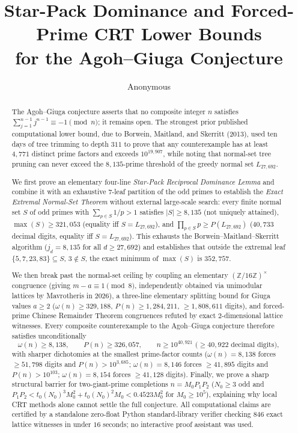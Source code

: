 \documentclass[11pt]{article}
\title{Star-Pack Dominance and Forced-Prime CRT Lower Bounds\\
for the Agoh--Giuga Conjecture}
\author{Anonymous}
\date{}
\theoremstyle{remark}
\begin{document}
\maketitle

\begin{abstract}
The Agoh--Giuga conjecture asserts that no composite integer $n$ satisfies
$\sum_{j=1}^{n-1} j^{n-1} \equiv -1 \pmod n$; it remains open. The strongest
prior published computational lower bound, due to Borwein, Maitland, and
Skerritt (2013), used ten days of tree trimming to depth $311$ to prove that any
counterexample has at least $4{,}771$ distinct prime factors and exceeds
$10^{19{,}907}$, while noting that normal-set tree pruning can never exceed the
$8{,}135$-prime threshold of the greedy normal set $L_{27,692}$.

We first prove an elementary four-line \emph{Star-Pack Reciprocal Dominance
Lemma} and combine it with an exhaustive $7$-leaf partition of the odd primes to
establish the \emph{Exact Extremal Normal-Set Theorem} without external
large-scale search: every finite normal set $S$ of odd primes with
$\sum_{p\in S} 1/p > 1$ satisfies $|S| \ge 8{,}135$ (not uniquely attained),
$\max(S) \ge 321{,}053$ (equality iff $S = L_{27,692}$), and
$\prod_{p\in S} p \ge P(L_{27,692})$ ($40{,}733$ decimal digits, equality iff
$S = L_{27,692}$). This exhausts the Borwein--Maitland--Skerritt algorithm
($j_d = 8{,}135$ for all $d \ge 27{,}692$) and establishes that outside the
extremal leaf $\{5,7,23,83\}\subseteq S$, $3\notin S$, the exact minimum of
$\max(S)$ is $352{,}757$.

We then break past the normal-set ceiling by coupling an elementary
$(\mathbb{Z}/16\mathbb{Z})^\times$ congruence (giving $m - a \equiv 1 \pmod 8$,
independently obtained via unimodular lattices by Mavrotheris in 2026), a
three-line elementary splitting bound for Giuga values $a \ge 2$
($\omega(n)\ge 329{,}188$, $P(n)\ge 1{,}284{,}211$, $\ge 1{,}808{,}611$ digits),
and forced-prime Chinese Remainder Theorem congruences refuted by exact
$2$-dimensional lattice witnesses. Every composite counterexample to the
Agoh--Giuga conjecture therefore satisfies unconditionally
\[
  \omega(n) \ge 8{,}138,
  \qquad
  P(n) \ge 326{,}057,
  \qquad
  n \ge 10^{40{,}921} \text{ ($\ge 40{,}922$ decimal digits)},
\]
with sharper dichotomies at the smallest prime-factor counts ($\omega(n)=8{,}138$
forces $\ge 51{,}798$ digits and $P(n) > 10^{3{,}685}$; $\omega(n)=8{,}146$
forces $\ge 41{,}895$ digits and $P(n) > 10^{103}$; $\omega(n)=8{,}154$ forces
$\ge 41{,}128$ digits). Finally, we prove a sharp structural barrier for
two-giant-prime completions $n = M_0 P_1 P_2$ ($N_0 \ge 3$ odd and
$P_1 P_2 < t_0(N_0)^3 M_0^2 + t_0(N_0)^2 M_0 < 0.4523 M_0^2$ for
$M_0 \ge 10^5$), explaining why local CRT methods alone cannot settle the full
conjecture. All computational claims are certified by a standalone zero-float
Python standard-library verifier checking $846$ exact lattice witnesses in
under $16$ seconds; no interactive proof assistant was used.
\end{abstract}
\end{document}
